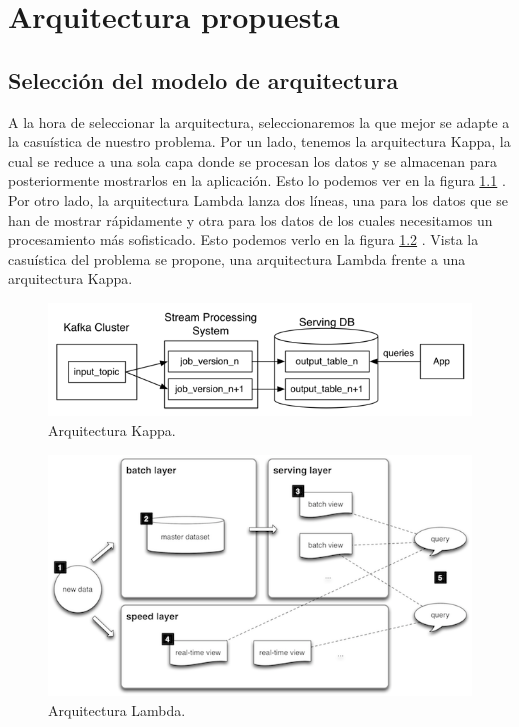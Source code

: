 \chapter{Arquitectura propuesta \label{propuesta}}

\section{Selección del modelo de arquitectura\label{arqSelect}}

A la hora de seleccionar la arquitectura, seleccionaremos la que mejor se
adapte a la casuística de nuestro problema. Por un lado, tenemos la
arquitectura Kappa, la cual se reduce a una sola capa donde se procesan los
datos y se almacenan para posteriormente mostrarlos en la aplicación. Esto
lo podemos ver en la figura \ref{arqKappa} \cite{LambdaKappa2}. Por otro
lado, la arquitectura Lambda lanza dos líneas, una para los datos que se
han de mostrar rápidamente y otra para los datos de los cuales necesitamos
un procesamiento más sofisticado. Esto podemos verlo en la figura
\ref{arqLambda} \cite{LambdaKappa}. Vista la casuística del problema se
propone, una arquitectura Lambda frente a una arquitectura Kappa.

\begin{figure}[htp]
\centering
\includegraphics[scale=0.70]{Imagenes/arq1.png}
\caption{Arquitectura Kappa.}
\label{arqKappa}
\end{figure}

\begin{figure}[htp]
\centering
\includegraphics[scale=0.70]{Imagenes/arq2.png}
\caption{Arquitectura Lambda.}
\label{arqLambda}
\end{figure}

